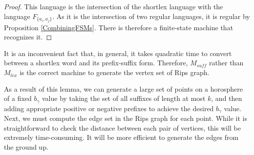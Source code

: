 \documentclass{amsart}
\theoremstyle{definition}
\theoremstyle{remark}
\begin{document}
	\begin{proof}
		
		This language is the intersection of the shortlex language with the language $F_{\{a_i, a_j\}}$. As it is the intersection of two regular languages, it is regular by Proposition \ref{CombiningFSMs}. There is therefore a finite-state machine that recognizes it. 
               
		
		
		
	\end{proof}
	
	It is an inconvenient fact that, in general, it takes quadratic time to convert between a shortlex word and its prefix-suffix form. Therefore, $M_{suff}$ rather than $M_{lex}$ is the correct machine to generate the vertex set of Rips graph.
	
	As a result of this lemma, we can generate a large set of points on a horosphere of a fixed $b_\gamma$ value by taking the set of all suffixes of length at most $k$, and then adding appropriate positive or negative prefixes to achieve the desired $b_\gamma$ value. Next, we must compute the edge set in the Rips graph for each point. While it is straightforward to check the distance between each pair of vertices, this will be extremely time-consuming. It will be more efficient to generate the edges from the ground up.	
	
\end{document}

